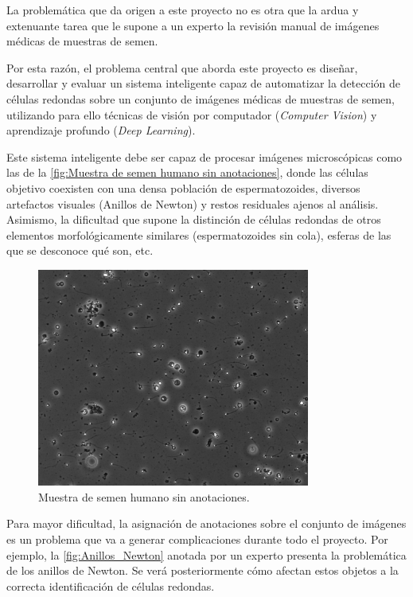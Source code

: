 \documentclass[12pt,a4paper,onecolumn,oneside]{report}
\begin{document}
La problemática que da origen a este proyecto no es otra que la ardua y extenuante tarea que le supone a un experto la revisión manual de imágenes médicas de muestras de semen.

Por esta razón, el problema central que aborda este proyecto es diseñar, desarrollar y evaluar un sistema inteligente capaz de automatizar la detección de células 
redondas sobre un conjunto de imágenes médicas de muestras de semen, utilizando para ello técnicas de visión por computador (\textit{Computer Vision}) y aprendizaje profundo (\textit{Deep Learning}).

Este sistema inteligente debe ser capaz de procesar imágenes microscópicas como las de la \autoref{fig:Muestra de semen humano sin anotaciones}, donde las células objetivo coexisten con una densa población de espermatozoides, diversos artefactos visuales (Anillos de Newton)
y restos residuales ajenos al análisis. Asimismo, la dificultad que supone la distinción de células redondas de otros elementos morfológicamente similares (espermatozoides sin cola), esferas de las que se desconoce qué son, etc.

\begin{figure}[H]
  \centering
  \includegraphics[width=0.8\textwidth]{figuras/rounds_cells/61.jpg}
  \caption{Muestra de semen humano sin anotaciones.}
  \label{fig:Muestra de semen humano sin anotaciones}
\end{figure}

Para mayor dificultad, la asignación de anotaciones sobre el conjunto de imágenes es un problema que va a generar complicaciones durante todo el proyecto. Por ejemplo,
la \autoref{fig:Anillos_Newton} anotada por un experto presenta la problemática de los anillos de Newton. Se verá posteriormente cómo afectan estos objetos a la correcta identificación de células redondas.
\end{document}
